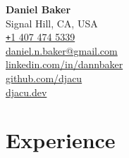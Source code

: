 \documentclass{article}
\begin{document}

\begin{flushleft}
    \textbf{\Huge Daniel Baker} \vspace{0.5em} \\
    Signal Hill, CA, USA \\
    \href{tel:14074745339}{\texttt{+}1 407 474 5339} \\
    \href{mailto:daniel.n.baker@gmail.com}{daniel.n.baker@gmail.com} \\
    \href{https://www.linkedin.com/in/dannbaker/}{linkedin.com/in/dannbaker} \\
    \href{https://github.com/djacu}{github.com/djacu} \\
    \href{https://djacu.dev/}{djacu.dev}
\end{flushleft}


\section{Experience}
\end{document}
